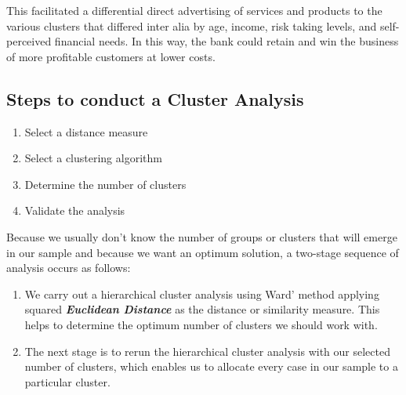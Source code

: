 This facilitated a differential direct advertising of services
and products to the various clusters that differed inter alia by age, income, risk taking levels, and self-perceived financial needs. In this way, the bank could retain and win the business of more profitable customers at lower costs.


\subsection{Steps to conduct a Cluster Analysis}
\begin{enumerate}
\item Select a distance measure
\item Select a clustering algorithm
\item Determine the number of clusters
\item Validate the analysis
\end{enumerate}
Because we usually don't know the number of groups or clusters that will emerge in our sample and because we want an optimum solution, a two-stage sequence of analysis occurs as follows:

\begin{enumerate}
\item We carry out a hierarchical cluster analysis using Ward' method applying squared
\textit{\textbf{Euclidean Distance}} as the distance or similarity measure. This helps to determine the
optimum number of clusters we should work with.
\item The next stage is to rerun the hierarchical cluster analysis with our selected number
of clusters, which enables us to allocate every case in our sample to a particular
cluster.
\end{enumerate}








